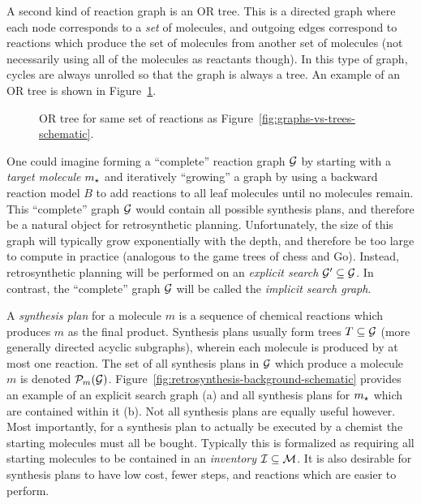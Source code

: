 A second kind of reaction graph is an OR tree.
This is a directed graph where each node corresponds to a \emph{set}
of molecules,
and outgoing edges correspond to reactions which produce the set of molecules
from another set of molecules (not necessarily using all of the molecules as reactants though).
In this type of graph, cycles are always unrolled so that the graph is always a tree.
An example of an OR tree is shown in Figure~\ref{fig:or-graph-schematic}.

\begin{figure}[ht]
    \centering
    
    \caption{OR tree for same set of reactions as Figure~\ref{fig:graphs-vs-trees-schematic}.}
    \label{fig:or-graph-schematic}
\end{figure}

One could imagine forming a ``complete'' reaction graph ${\mathcal{G}}$ by starting with a
\emph{target molecule} $m_\star$ and iteratively ``growing''
a graph by using a backward reaction model $B$ to add reactions
to all leaf molecules until no molecules remain.
This ``complete'' graph ${\mathcal{G}}$ would contain all possible synthesis plans,
and therefore be a natural object for retrosynthetic planning.
Unfortunately, the size of this graph will typically grow exponentially
with the depth, and therefore be too large to compute in practice
(analogous to the game trees of chess and Go).
Instead, retrosynthetic planning will be performed
on an \emph{explicit search} ${\mathcal{G}}'\subseteq{\mathcal{G}}$.
In contrast, the ``complete'' graph ${\mathcal{G}}$ will be called the \emph{implicit search graph}.

A \emph{synthesis plan} for a molecule $m$ is a sequence of chemical reactions
which produces $m$ as the final product.
Synthesis plans usually form trees $T\subseteq{\mathcal{G}}$
(more generally directed acyclic subgraphs),
wherein each molecule is produced by at most one reaction.
The set of all synthesis plans in ${\mathcal{G}}$ which produce a molecule $m$
is denoted $\mathcal{P}_m({\mathcal{G}})$.
Figure~\ref{fig:retrosynthesis-background-schematic} provides an example
of an explicit search graph (a) and all synthesis plans for $m_\star$
which are contained within it (b).
Not all synthesis plans are equally useful however.
Most importantly,
for a synthesis plan to actually be executed by a chemist
the starting molecules must all be bought.
Typically this is formalized as requiring all starting molecules
to be contained in an \emph{inventory} ${\mathcal{I}}\subseteq\mathcal{M}$.
It is also desirable for synthesis plans to have low cost,
fewer steps, and reactions which are easier to perform.

